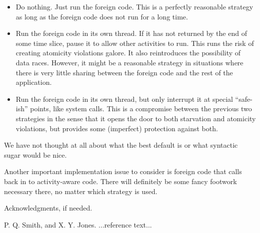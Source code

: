 \documentclass[11pt,preprint]{sigplanconf}
\begin{document}
\begin{itemize}
\item Do nothing.  Just run the foreign code.  This is a perfectly
  reasonable strategy as long as the foreign code does not run for a
  long time.
\item Run the foreign code in its own thread.  If it has not returned by
  the end of some time slice, pause it to allow other activities to run.
  This runs the risk of creating atomicity violations galore.  It also
  reintroduces the possibility of data races.  However, it might be a
  reasonable strategy in situations where there is very little sharing
  between the foreign code and the rest of the application.
\item Run the foreign code in its own thread, but only interrupt it at
  special ``safe-ish'' points, like system calls.  This is a compromise
  between the previous two strategies in the sense that it opens the
  door to both starvation and atomicity violations, but provides some
  (imperfect) protection against both.
\end{itemize}

We have not thought at all about what the best default is or what
syntactic sugar would be nice.

Another important implementation issue to consider is foreign code that
calls back in to activity-aware code.  There will definitely be some
fancy footwork necessary there, no matter which strategy is used.

\acks

Acknowledgments, if needed.





\begin{thebibliography}{}
\softraggedright

P. Q. Smith, and X. Y. Jones. ...reference text...

\end{thebibliography}
\end{document}
